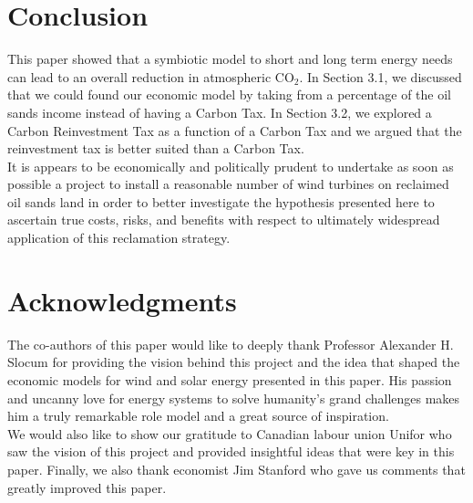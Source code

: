 \documentclass[11pt]{article}
\begin{document}

\section{Conclusion}
\indent This paper showed that a symbiotic model to short and long term energy needs can lead to an overall reduction in atmospheric CO$_2$. In Section 3.1, we discussed that we could found our economic model by taking from a percentage of the oil sands income instead of having a Carbon Tax. In Section 3.2, we explored a Carbon Reinvestment Tax as a function of a Carbon Tax and we argued that the reinvestment tax is better suited than a Carbon Tax. \\
\indent It is appears to be economically and politically prudent to undertake as soon as possible a project to install a reasonable number of wind turbines on reclaimed oil sands land in order to better investigate the hypothesis presented here to ascertain true costs, risks, and benefits with respect to ultimately widespread application of this reclamation strategy.


\section*{Acknowledgments}
\indent The co-authors of this paper would like to deeply thank Professor Alexander H. Slocum for providing the vision behind this project and the idea that shaped the economic models for wind and solar energy presented in this paper. His passion and uncanny love for energy systems to solve humanity’s grand challenges makes him a truly remarkable role model and a great source of inspiration. \\
\indent We would also like to show our gratitude to Canadian labour union Unifor who saw the vision of this project and provided insightful ideas that were key in this paper. Finally, we also thank economist Jim Stanford who gave us comments that greatly improved this paper. 


\end{document}
